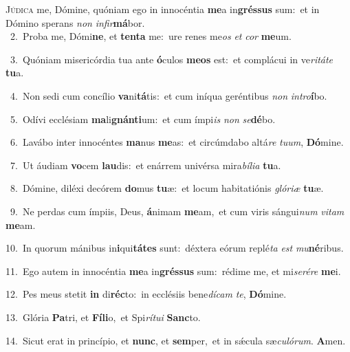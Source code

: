 \lettrine{\initial\textcolor{\initialcolor}{J}}{údica} me, Dómine, quóniam ego in innocéntia \textbf{me}\-a in\-\textbf{grés}\-\textbf{sus} sum:~\star et in Dómino sperans \textit{non} \textit{in}\-\textit{fir}\textbf{má}bor.\\
{\numbfont\textcolor{\numbcolor}{~2.}}~Proba me, Dómi\-\textbf{ne}\-, et \textbf{ten}\-\textbf{ta} me:~\star ure renes me\textit{os} \textit{et} \textit{cor} \textbf{me}\-um.\par
{\numbfont\textcolor{\numbcolor}{~3.}}~Quóniam misericórdia tua ante \textbf{ó}\-culos \textbf{me}\-\textbf{os} est:~\star et complácui in ve\-\textit{ri}\-\textit{tá}\textit{te} \textbf{tu}\-a.\par
{\numbfont\textcolor{\numbcolor}{~4.}}~Non sedi cum concílio \textbf{va}\-ni\-\textbf{tá}\-tis:~\star et cum iníqua geréntibus \textit{non} \textit{in}\-\textit{tro}\textbf{í}bo.\par
{\numbfont\textcolor{\numbcolor}{~5.}}~Odívi ecclésiam \textbf{ma}\-li\-\textbf{gnán}\-\textbf{ti}um:~\star et cum ímpi\textit{is} \textit{non} \textit{se}\-\textbf{dé}bo.\par
{\numbfont\textcolor{\numbcolor}{~6.}}~Lavábo inter innocéntes \textbf{ma}\-nus \textbf{me}\-as:~\star et circúmdabo altá\textit{re} \textit{tu}\-\textit{um}, \textbf{Dó}\-mine.\par
{\numbfont\textcolor{\numbcolor}{~7.}}~Ut áudiam \textbf{vo}\-cem \textbf{lau}\-dis:~\star et enárrem univérsa mira\-\textit{bí}\-\textit{li}\textit{a} \textbf{tu}\-a.\par
{\numbfont\textcolor{\numbcolor}{~8.}}~Dómine, diléxi decórem \textbf{do}\-mus \textbf{tu}\-æ:~\star et locum habitatiónis \textit{gló}\-\textit{ri}\textit{æ} \textbf{tu}\-æ.\par
{\numbfont\textcolor{\numbcolor}{~9.}}~Ne perdas cum ímpiis, Deus, \textbf{á}\-nimam \textbf{me}\-am,~\star et cum viris sángui\textit{num} \textit{vi}\-\textit{tam} \textbf{me}\-am.\par
{\numbfont\textcolor{\numbcolor}{10.}}~In quorum mánibus in\-\textbf{i}\-qui\-\textbf{tá}\-\textbf{tes} sunt:~\star déxtera eórum replé\textit{ta} \textit{est} \textit{mu}\-\textbf{né}ribus.\par
{\numbfont\textcolor{\numbcolor}{11.}}~Ego autem in innocéntia \textbf{me}\-a in\-\textbf{grés}\-\textbf{sus} sum:~\star rédime me, et mi\-\textit{se}\-\textit{ré}\textit{re} \textbf{me}\-i.\par
{\numbfont\textcolor{\numbcolor}{12.}}~Pes meus stetit \textbf{in} di\-\textbf{réc}\-to:~\star in ecclésiis bene\-\textit{dí}\-\textit{cam} \textit{te}\-, \textbf{Dó}\-mine.\par
{\numbfont\textcolor{\numbcolor}{13.}}~Glória \textbf{Pa}\-tri, et \textbf{Fí}\-\textbf{li}o,~\star et Spi\-\textit{rí}\-\textit{tu}\textit{i} \textbf{Sanc}\-to.\par
{\numbfont\textcolor{\numbcolor}{14.}}~Sicut erat in princípio, et \textbf{nunc}\-, et \textbf{sem}\-per,~\star et in sǽcula sæ\-\textit{cu}\-\textit{ló}\textit{rum}. \textbf{A}\-men.\par
